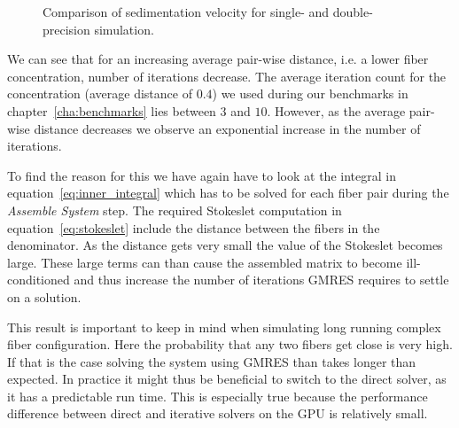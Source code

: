 \documentclass[a4paper,11pt]{kth-mag}
\begin{document}
\begin{figure}[!htbp]
  \centering
  \caption{Comparison of sedimentation velocity for single- and double-precision simulation.}
  \label{fig:concentration_gmres}
\end{figure}

We can see that for an increasing average pair-wise distance, i.e. a lower fiber concentration, number of iterations decrease. The average iteration count for the concentration (average distance of $0.4$) we used during our benchmarks in chapter~\ref{cha:benchmarks} lies between $3$ and $10$. However, as the average pair-wise distance decreases we observe an exponential increase in the number of iterations.

To find the reason for this we have again have to look at the integral in equation~\eqref{eq:inner_integral} which has to be solved for each fiber pair during the \emph{Assemble System} step. The required Stokeslet computation in equation~\eqref{eq:stokeslet} include the distance between the fibers in the denominator. As the distance gets very small the value of the Stokeslet becomes large. These large terms can than cause the assembled matrix to become ill-conditioned and thus increase the number of iterations GMRES requires to settle on a solution.

This result is important to keep in mind when simulating long running complex fiber configuration. Here the probability that any two fibers get close is very high. If that is the case solving the system using GMRES than takes longer than expected. In practice it might thus be beneficial to switch to the direct solver, as it has a predictable run time. This is especially true because the performance difference between direct and iterative solvers on the GPU is relatively small.
\end{document}
